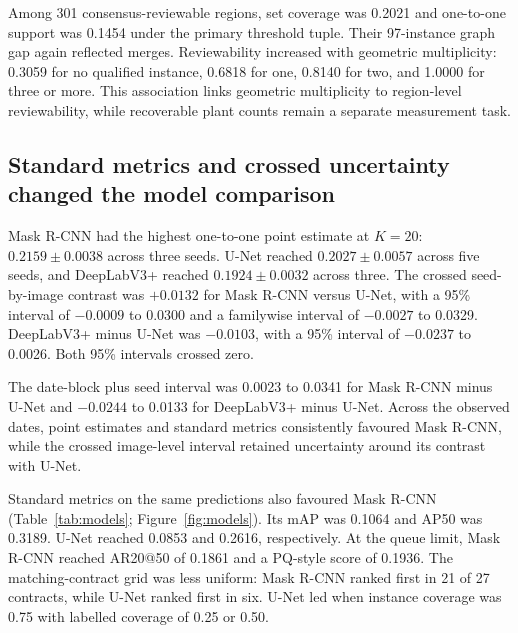 \documentclass[preprint,12pt]{elsarticle}
\begin{document}
Among 301 consensus-reviewable regions, set coverage was 0.2021 and one-to-one support was 0.1454 under the primary threshold tuple. Their 97-instance graph gap again reflected merges. Reviewability increased with geometric multiplicity: 0.3059 for no qualified instance, 0.6818 for one, 0.8140 for two, and 1.0000 for three or more. This association links geometric multiplicity to region-level reviewability, while recoverable plant counts remain a separate measurement task.

\subsection{Standard metrics and crossed uncertainty changed the model comparison}

Mask R-CNN had the highest one-to-one point estimate at $K=20$: $0.2159\pm0.0038$ across three seeds. U-Net reached $0.2027\pm0.0057$ across five seeds, and DeepLabV3+ reached $0.1924\pm0.0032$ across three. The crossed seed-by-image contrast was $+0.0132$ for Mask R-CNN versus U-Net, with a 95\% interval of $-0.0009$ to 0.0300 and a familywise interval of $-0.0027$ to 0.0329. DeepLabV3+ minus U-Net was $-0.0103$, with a 95\% interval of $-0.0237$ to 0.0026. Both 95\% intervals crossed zero.

The date-block plus seed interval was 0.0023 to 0.0341 for Mask R-CNN minus U-Net and $-0.0244$ to 0.0133 for DeepLabV3+ minus U-Net. Across the observed dates, point estimates and standard metrics consistently favoured Mask R-CNN, while the crossed image-level interval retained uncertainty around its contrast with U-Net.

Standard metrics on the same predictions also favoured Mask R-CNN (Table~\ref{tab:models}; Figure~\ref{fig:models}). Its mAP was 0.1064 and AP50 was 0.3189. U-Net reached 0.0853 and 0.2616, respectively. At the queue limit, Mask R-CNN reached AR20@50 of 0.1861 and a PQ-style score of 0.1936. The matching-contract grid was less uniform: Mask R-CNN ranked first in 21 of 27 contracts, while U-Net ranked first in six. U-Net led when instance coverage was 0.75 with labelled coverage of 0.25 or 0.50.
\end{document}
